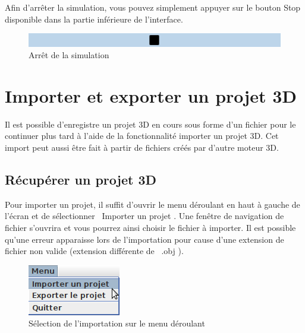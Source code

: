 \documentclass[11pt]{report}
\begin{document}
Afin d'arrêter la simulation, vous pouvez simplement appuyer sur le bouton Stop disponible dans la partie inférieure de l'interface.

\begin{figure}[h]
  \centering
  \includegraphics[width=16cm]{./btn_stop.png}
  \caption{Arrêt de la simulation}
\end{figure}

\chapter{Importer et exporter un projet 3D}

Il est possible d'enregistre un projet 3D en cours sous forme d'un fichier pour le continuer plus tard à l'aide de 
la fonctionnalité importer un projet 3D. Cet import peut aussi être fait à partir de fichiers créés par d'autre moteur 3D.

\section{Récupérer un projet 3D}

Pour importer un projet, il suffit d'ouvrir le menu déroulant en haut à gauche de l'écran et de sélectionner \flqq\ Importer un projet \frqq.
Une fenêtre de navigation de fichier s'ouvrira et vous pourrez ainsi choisir le fichier à importer.
Il est possible qu'une erreur apparaisse lors de l'importation pour cause d'une extension de fichier non valide (extension différente de \flqq\ .obj \frqq).

\begin{figure}[h]
  \centering
  \includegraphics{./menu_imp.png}
  \caption{Sélection de l'importation sur le menu déroulant}
\end{figure}
\end{document}
